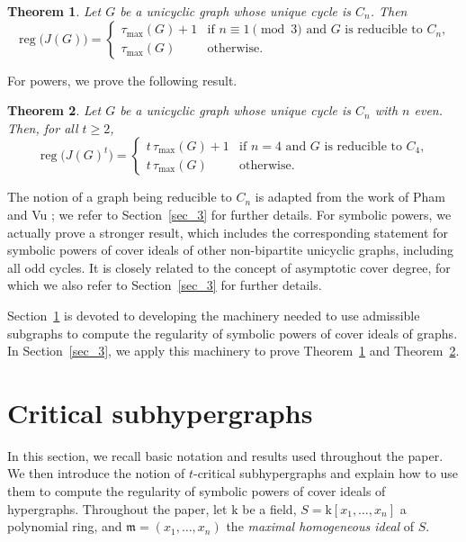 \documentclass[12pt,amscd]{amsart}
\newtheorem{thm}{Theorem}[section]
\theoremstyle{definition}
\DeclareMathOperator{\reg}{reg}
\def\k {\mathrm k}
\begin{document}
\begin{thm}\label{thm_reg_unicycli}
Let $G$ be a unicyclic graph whose unique cycle is $C_n$. Then
\[
\reg\bigl(J(G)\bigr)
=
\begin{cases}
\tau_{\max}(G) + 1 & \text{if } n \equiv 1 \pmod 3 \text{ and } G \text{ is reducible to } C_n,\\
\tau_{\max}(G) & \text{otherwise}.
\end{cases}
\]
\end{thm}

For powers, we prove the following result.

\begin{thm}\label{main}
Let $G$ be a unicyclic graph whose unique cycle is $C_n$ with $n$ even. Then, for all $t \ge 2$,
\[
\reg\bigl(J(G)^t\bigr)
=
\begin{cases}
t\,\tau_{\max}(G) + 1 & \text{if } n = 4 \text{ and } G \text{ is reducible to } C_4,\\
t\,\tau_{\max}(G) & \text{otherwise}.
\end{cases}
\]
\end{thm}

The notion of a graph being reducible to $C_n$ is adapted from the work of Pham and Vu \cite{PV}; we refer to Section~\ref{sec_3} for further details. For symbolic powers, we actually prove a stronger result, which includes the corresponding statement for symbolic powers of cover ideals of other non-bipartite unicyclic graphs, including all odd cycles. It is closely related to the concept of asymptotic cover degree, for which we also refer to Section~\ref{sec_3} for further details.

Section~\ref{sec_2} is devoted to developing the machinery needed to use admissible subgraphs to compute the regularity of symbolic powers of cover ideals of graphs. In Section~\ref{sec_3}, we apply this machinery to prove Theorem~\ref{thm_reg_unicycli} and Theorem~\ref{main}.

\section{Critical subhypergraphs}\label{sec_2}
In this section, we recall basic notation and results used throughout the paper. We then introduce the notion of \( t \)-critical subhypergraphs and explain how to use them to compute the regularity of symbolic powers of cover ideals of hypergraphs. Throughout the paper, let \( \k \) be a field, \( S = \k[x_1, \ldots, x_n] \) a polynomial ring, and \( \mathfrak{m} = (x_1, \ldots, x_n) \) the \emph{maximal homogeneous ideal} of \( S \).
\end{document}

